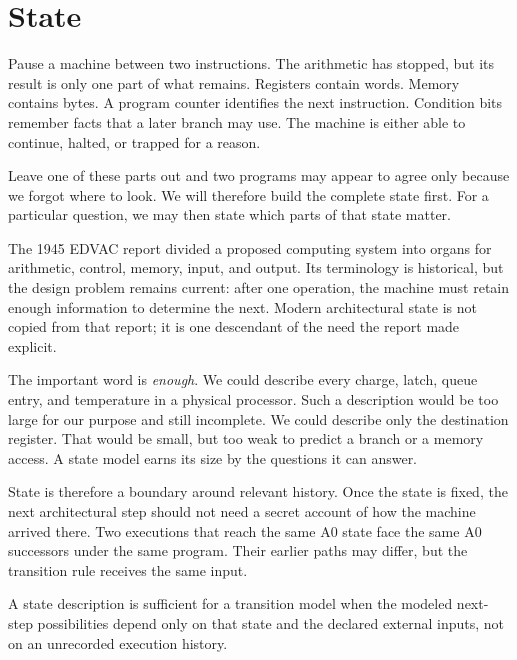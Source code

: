 \chapter{State}
\label{ch:state}

Pause a machine between two instructions. The arithmetic has stopped, but its
result is only one part of what remains. Registers contain words. Memory
contains bytes. A program counter identifies the next instruction. Condition
bits remember facts that a later branch may use. The machine is either able to
continue, halted, or trapped for a reason.

Leave one of these parts out and two programs may appear to agree only because
we forgot where to look. We will therefore build the complete state first.
For a particular question, we may then state which parts of that state matter.

\begin{archive}[title={\iconArchive\ A stored program needs a place to resume}]
The 1945 EDVAC report divided a proposed computing system into organs for
arithmetic, control, memory, input, and output. Its terminology is historical,
but the design problem remains current: after one operation, the machine must
retain enough information to determine the next. Modern architectural state
is not copied from that report; it is one descendant of the need the report
made explicit.\autocite{vonneumann1945edvac}
\end{archive}

The important word is \emph{enough}. We could describe every charge, latch,
queue entry, and temperature in a physical processor. Such a description
would be too large for our purpose and still incomplete. We could describe
only the destination register. That would be small, but too weak to predict a
branch or a memory access. A state model earns its size by the questions it
can answer.

State is therefore a boundary around relevant history. Once the state is
fixed, the next architectural step should not need a secret account of how
the machine arrived there. Two executions that reach the same A0 state face
the same A0 successors under the same program. Their earlier paths may differ,
but the transition rule receives the same input.

\begin{definition}[title={State sufficiency}]
A state description is sufficient for a transition model when the modeled
next-step possibilities depend only on that state and the declared external
inputs, not on an unrecorded execution history.
\end{definition}

